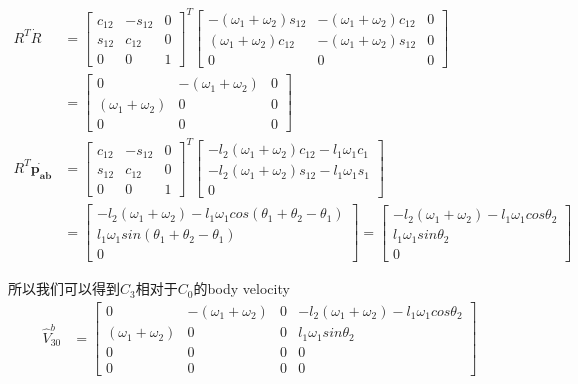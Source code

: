 \documentclass{ctexart}
\begin{document}
\begin{equation*}
	\begin{aligned}
	R^T\dot{R} &=\begin{bmatrix}
		c_{12} & -s_{12} & 0 \\
		s_{12} & c_{12} & 0 \\
		0 & 0 & 1
	\end{bmatrix}^T
	\begin{bmatrix}
		-(\omega_1 + \omega_2)s_{12} & -(\omega_1 + \omega_2)c_{12} & 0 \\
		(\omega_1 + \omega_2)c_{12} & -(\omega_1 + \omega_2)s_{12} & 0 \\
		0 & 0 & 0
	\end{bmatrix}\\&= \begin{bmatrix}
		0 & -(\omega_1+\omega_2) & 0 \\
		(\omega_1+\omega_2)& 0 & 0 \\
		0 & 0 & 0
	\end{bmatrix}\\
	R^T \dot{\boldsymbol{p_{ab}}} &= \begin{bmatrix}
		c_{12} & -s_{12} & 0 \\
		s_{12} & c_{12} & 0 \\
		0 & 0 & 1
	\end{bmatrix}^T
	\begin{bmatrix}
		-l_2(\omega_1 + \omega_2)c_{12} - l_1\omega_1c_1 \\
		-l_2(\omega_1 + \omega_2)s_{12} - l_1\omega_1s_1 \\
		0
	\end{bmatrix}\\ &= \begin{bmatrix}
		-l_2(\omega_1 + \omega_2)-l_1\omega_1cos(\theta_1+\theta_2-\theta_1) \\
		l_1\omega_1sin(\theta_1+\theta_2-\theta_1) \\
		0
	\end{bmatrix}
	= \begin{bmatrix}
		-l_2(\omega_1 + \omega_2)-l_1\omega_1cos\theta_2 \\
		l_1\omega_1sin\theta_2 \\
		0
	\end{bmatrix}
\end{aligned}
\end{equation*}

所以我们可以得到$C_3$相对于$C_0$的body velocity
\begin{equation*}
	\begin{aligned}
		\hat{V}^b_{30} &= \begin{bmatrix}
			0 & -(\omega_1+\omega_2) & 0 & -l_2(\omega_1 + \omega_2)-l_1\omega_1cos\theta_2 \\
			(\omega_1+\omega_2)& 0 & 0 & l_1\omega_1sin\theta_2 \\
			0 & 0 & 0 & 0 \\
			0 & 0 & 0 & 0
		\end{bmatrix}
	\end{aligned}
\end{equation*}
\end{document}
